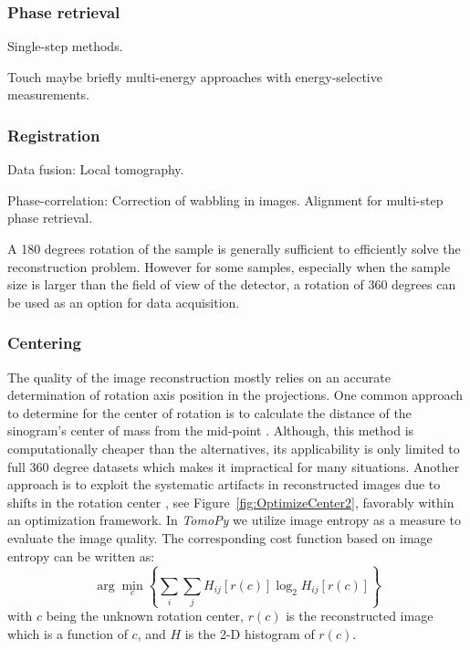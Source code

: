 \documentclass[pdf]{iucr}              %
\begin{document}
\subsubsection{Phase retrieval}

Single-step methods. \cite{Paganin_2002}

Touch maybe briefly multi-energy approaches with energy-selective measurements.


\subsubsection{Registration}

Data fusion: Local tomography. 

Phase-correlation: Correction of wabbling in images. Alignment for multi-step phase retrieval.

A 180 degrees rotation of the sample is generally sufficient to efficiently solve the reconstruction problem. However for some samples, especially when the sample size is larger than the field of view of the detector, a  rotation of 360 degrees can be used as an option for data acquisition. 

\subsubsection{Centering}

The quality of the image reconstruction mostly relies on an accurate determination of rotation axis position in the projections.  One common approach to determine for the center of rotation is to calculate the distance of the sinogram's center of mass from the mid-point \cite{Azevedo}. Although, this method is computationally cheaper than the alternatives, its applicability is only limited to full 360 degree datasets which makes it impractical for many situations. Another approach is to exploit the systematic artifacts in reconstructed images due to shifts in the rotation center \cite{donath_spie_2006}, see Figure~\ref{fig:OptimizeCenter2}, favorably within an optimization framework. In \textit{TomoPy} we utilize image entropy as a measure to evaluate the image quality. The corresponding cost function based on image entropy can be written as:
\begin{equation}
\arg \min_c \left\{\sum_i \sum_jH_{ij}\left[r(c)\right]\log_2 H_{ij}\left[r(c)\right]\right\}
\end{equation}
with $c$ being the unknown rotation center, $r(c)$ is the reconstructed image which is a function of $c$, and $H$ is the 2-D histogram of $r(c)$. 
\end{document}
